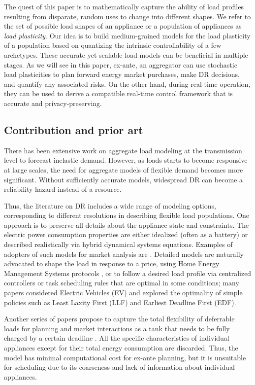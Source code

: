 \documentclass[10pt]{IEEEtran}
\begin{document}
 The quest of this paper is to mathematically capture the ability of load profiles  resulting  from disparate, random uses to change into different shapes. We refer to the set of possible load shapes of an appliance or a population of appliances as {\it load plasticity}. Our idea is to build medium-grained models for the load plasticity of a population  based on quantizing the intrinsic controllability of a few archetypes. These accurate yet scalable load models can be beneficial in multiple stages.
As we will see in this paper, ex-ante, an aggregator can use stochastic load plasticities   to plan forward energy market purchases, make DR decisions, and quantify any associated risks. On the other hand, during real-time operation, they can be used to derive a compatible real-time control framework that is accurate and privacy-preserving. 


\subsection{Contribution and prior art}
There has been extensive work on aggregate load modeling at the transmission level to forecast inelastic demand. However, as loads starts to become responsive at  large scales, the need for aggregate models of flexible demand becomes more significant. Without sufficiently accurate models, widespread DR can become a reliability hazard instead of a resource.

 Thus, the literature on DR includes a wide range of modeling options, corresponding to different resolutions in describing flexible load populations.  One approach is to preserve all details about the appliance state and constraints. The electric power consumption properties are either idealized (often as a battery) or described realistically via hybrid dynamical systems equations. Examples of adopters of such models for market analysis are  \cite{galus,6084772,6419868,6507354,6145671}. Detailed models are naturally advocated to shape the load in response to a price, using Home Energy Management Systems protocols \cite{mohsenian2010autonomous,kefayati2010efficient}, or to follow a desired load profile via centralized controllers or task scheduling rules that are optimal in some conditions; many papers considered Electric Vehicles (EV) \cite{kesidis,chen2012large,subramanian2012real,ramraja,6471273} and explored the optimality of simple policies such as  Least Laxity First (LLF) and Earliest Deadline First (EDF). 

 
Another series of papers propose to capture the total flexibility of deferrable loads for planning and market interactions as a tank that needs to be fully charged by a certain deadline \cite{homer, 6426102,ortega}. All the specific characteristics of individual appliances except for their total energy consumption are discarded. Thus, the model has minimal computational cost  for ex-ante planning, but it is unsuitable for scheduling due to its coarseness and lack of information about individual appliances. 
\end{document}
